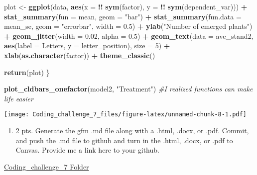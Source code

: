 \documentclass[
]{article}
\newenvironment{Shaded}{\begin{snugshade}}{\end{snugshade}}
\newcommand{\AttributeTok}[1]{\textcolor[rgb]{0.13,0.29,0.53}{#1}}
\newcommand{\CommentTok}[1]{\textcolor[rgb]{0.56,0.35,0.01}{\textit{#1}}}
\newcommand{\DecValTok}[1]{\textcolor[rgb]{0.00,0.00,0.81}{#1}}
\newcommand{\FloatTok}[1]{\textcolor[rgb]{0.00,0.00,0.81}{#1}}
\newcommand{\FunctionTok}[1]{\textcolor[rgb]{0.13,0.29,0.53}{\textbf{#1}}}
\newcommand{\NormalTok}[1]{#1}
\newcommand{\OtherTok}[1]{\textcolor[rgb]{0.56,0.35,0.01}{#1}}
\newcommand{\SpecialCharTok}[1]{\textcolor[rgb]{0.81,0.36,0.00}{\textbf{#1}}}
\newcommand{\StringTok}[1]{\textcolor[rgb]{0.31,0.60,0.02}{#1}}
\providecommand{\tightlist}{%
  \setlength{\itemsep}{0pt}\setlength{\parskip}{0pt}}
\begin{document}
\begin{Shaded}
\begin{Highlighting}[]
\NormalTok{  plot }\OtherTok{\textless{}{-}} \FunctionTok{ggplot}\NormalTok{(data, }\FunctionTok{aes}\NormalTok{(}\AttributeTok{x =} \SpecialCharTok{!!} \FunctionTok{sym}\NormalTok{(factor), }\AttributeTok{y =} \SpecialCharTok{!!} \FunctionTok{sym}\NormalTok{(dependent\_var))) }\SpecialCharTok{+} 
    \FunctionTok{stat\_summary}\NormalTok{(}\AttributeTok{fun =}\NormalTok{ mean, }\AttributeTok{geom =} \StringTok{"bar"}\NormalTok{) }\SpecialCharTok{+}
    \FunctionTok{stat\_summary}\NormalTok{(}\AttributeTok{fun.data =}\NormalTok{ mean\_se, }\AttributeTok{geom =} \StringTok{"errorbar"}\NormalTok{, }\AttributeTok{width =} \FloatTok{0.5}\NormalTok{) }\SpecialCharTok{+}
    \FunctionTok{ylab}\NormalTok{(}\StringTok{"Number of emerged plants"}\NormalTok{) }\SpecialCharTok{+} 
    \FunctionTok{geom\_jitter}\NormalTok{(}\AttributeTok{width =} \FloatTok{0.02}\NormalTok{, }\AttributeTok{alpha =} \FloatTok{0.5}\NormalTok{) }\SpecialCharTok{+}
    \FunctionTok{geom\_text}\NormalTok{(}\AttributeTok{data =}\NormalTok{ ave\_stand2, }\FunctionTok{aes}\NormalTok{(}\AttributeTok{label =}\NormalTok{ Letters, }\AttributeTok{y =}\NormalTok{ letter\_position), }\AttributeTok{size =} \DecValTok{5}\NormalTok{) }\SpecialCharTok{+}
    \FunctionTok{xlab}\NormalTok{(}\FunctionTok{as.character}\NormalTok{(factor)) }\SpecialCharTok{+}
    \FunctionTok{theme\_classic}\NormalTok{()}
  
  \FunctionTok{return}\NormalTok{(plot)}
\NormalTok{\}}
\end{Highlighting}
\end{Shaded}

\begin{Shaded}
\begin{Highlighting}[]
\FunctionTok{plot\_cldbars\_onefactor}\NormalTok{(model2, }\StringTok{"Treatment"}\NormalTok{) }\CommentTok{\#I realized functions can make life easier}
\end{Highlighting}
\end{Shaded}

\texttt{[image: Coding\_challenge\_7\_files/figure-latex/unnamed-chunk-8-1.pdf]}

\begin{enumerate}
\def\labelenumi{\arabic{enumi}.}
\setcounter{enumi}{5}
\tightlist
\item
  2 pts. Generate the gfm .md file along with a .html, .docx, or .pdf.
  Commit, and push the .md file to github and turn in the .html, .docx,
  or .pdf to Canvas. Provide me a link here to your github.
\end{enumerate}

\href{https://github.com/ppg0001/PLPA_Assignment/tree/main/Coding_challenge_7}{Coding\_challenge\_7
Folder}
\end{document}
